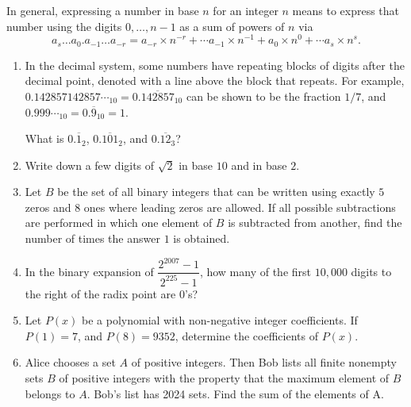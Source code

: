 \documentclass[11pt,leqno]{article}
\begin{document}
In general, expressing a number in base $n$ for an integer $n$ means to express that number using the digits $0,\dots,n-1$ as a sum of powers of $n$ via 
\[a_s\dots a_0.a_{-1}\dots a_{-r} = a_{-r}\times n^{-r} + \cdots a_{-1}\times n^{-1} + a_0\times n^0 + \cdots a_s\times n^s.\]
\newpage
\begin{enumerate}
    \item In the decimal system, some numbers have repeating blocks of digits after the decimal point, denoted with a line above the block that repeats. For example, $0.142857142857\cdots_{10} = 0.\overline{142857}_{10}$ can be shown to be the fraction $1/7$, and $0.999\cdots_{10} = 0.\overline{9}_{10} = 1$.

    What is $0.\overline{1}_2$, $0.\overline{101}_2$, and $0.\overline{12}_3$? \vspace*{\fill} 
    \item Write down a few digits of $\sqrt{2}$ in base $10$ and in base $2$.\vspace*{\fill}
    \newpage \item Let $B$ be the set of all binary integers that can be written using exactly $5$ zeros and $8$ ones where leading zeros are allowed. If all possible subtractions are performed in which one element of $B$ is subtracted from another, find the number of times the answer $1$ is obtained. \vspace*{\fill} %
    \item In the binary expansion of $\dfrac{2^{2007}-1}{2^{225}-1}$, how many of the first $10,000$ digits to the right of the radix point are $0$'s?\vspace*{\fill} %
    \newpage \item  Let $P(x)$ be a polynomial with non-negative integer coefficients. If $P(1) = 7$, and $P(8) = 9352$, determine the coefficients of $P(x)$. \vspace*{\fill} %
    \item Alice chooses a set $A$ of positive integers. Then Bob lists all finite nonempty sets $B$ of positive integers with the property that the maximum element of $B$ belongs to $A$. Bob's list has 2024 sets. Find the sum of the elements of A. \vspace*{\fill} %
\end{enumerate}
\end{document}
